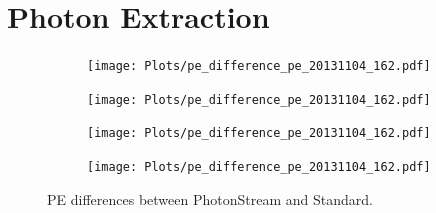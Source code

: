 \section{Photon Extraction}
%
\begin{figure}
  \begin{subfigure}{\textwidth}
    \centering
    \texttt{[image: Plots/pe\_difference\_pe\_20131104\_162.pdf]}
  \end{subfigure}
  \begin{subfigure}{\textwidth}
    \centering
    \texttt{[image: Plots/pe\_difference\_pe\_20131104\_162.pdf]}
  \end{subfigure}
  \begin{subfigure}{\textwidth}
    \centering
    \texttt{[image: Plots/pe\_difference\_pe\_20131104\_162.pdf]}
  \end{subfigure}
  \begin{subfigure}{\textwidth}
    \centering
    \texttt{[image: Plots/pe\_difference\_pe\_20131104\_162.pdf]}
  \end{subfigure}
  \caption{PE differences between PhotonStream and Standard.}
  \label{fig:difference}
\end{figure}

